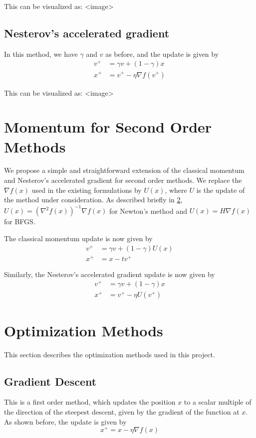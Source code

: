\documentclass{article}
\begin{document}
This can be visualized as:
<image>

\subsection{Nesterov's accelerated gradient}
In this method, we have $\gamma$ and $v$ as before, and the update is given by
\begin{align}
v^+ &= \gamma v + (1-\gamma)x \\
x^+ &= v^+ - \eta \nabla f(v^+)
\end{align}

This can be visualized as:
<image>

\section{Momentum for Second Order Methods}\label{methodology}

We propose a simple and straightforward extension of the classical momentum and Nesterov's accelerated gradient for second order methods. We replace the $\nabla f(x)$ used in the existing formulations by $U(x)$, where $U$ is the update of the method under consideration. As described briefly in \ref{opt}, $U(x)=\left(\nabla^2 f(x) \right)^{-1}\nabla f(x)$ for Newton's method and $U(x)=H \nabla f(x)$ for BFGS.

The classical momentum update is now given by
\begin{align*}
v^{+} &= \gamma v + (1-\gamma) U(x) \\
x^{+} &= x - tv^{+}
\end{align*}

Similarly, the Nesterov's accelerated gradient update is now given by
\begin{align}
v^+ &= \gamma v + (1-\gamma)x \\
x^+ &= v^+ - \eta U(v^+)
\end{align}

\section{Optimization Methods}\label{opt}
This section describes the optimization methods used in this project.

\subsection{Gradient Descent}
This is a first order method, which updates the position $x$ to a scalar multiple of the direction of the steepest descent, given by the gradient of the function at $x$. As shown before, the update is given by
\begin{equation}
x^+ = x - \eta \nabla f(x)
\end{equation}
\end{document}
